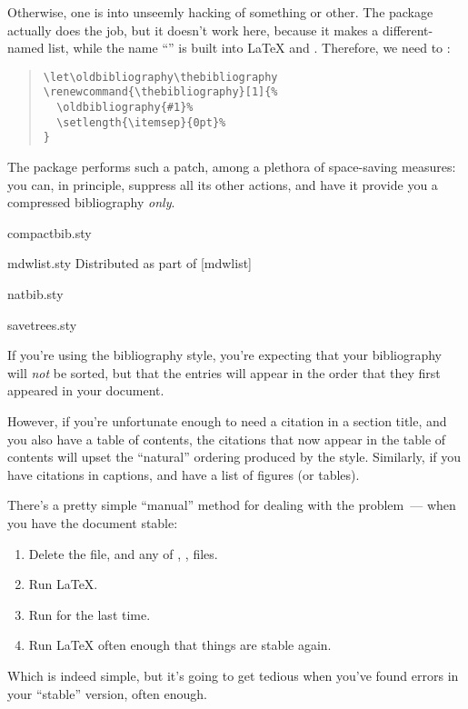 Otherwise, one is into unseemly hacking of something or other.  The
 package actually does the job, but it doesn't work
here, because it makes a different-named list, while the name
``'' is built into \LaTeX{} and
\BibTeX{}.  Therefore, we need to %
:
\begin{quote}
\begin{verbatim}
\let\oldbibliography\thebibliography
\renewcommand{\thebibliography}[1]{%
  \oldbibliography{#1}%
  \setlength{\itemsep}{0pt}%
}
\end{verbatim}
\end{quote}
The  package performs such a patch, among a
plethora of space-saving measures: you can, in principle, suppress all
its other actions, and have it provide you a compressed bibliography
\emph{only}.
\begin{ctanrefs}
\item[compactbib.sty]
\item[mdwlist.sty]Distributed as part of [mdwlist]
\item[natbib.sty]
\item[savetrees.sty]
\end{ctanrefs}


If you're using the  bibliography style, you're
expecting that your bibliography will \emph{not} be sorted, but that
the entries will appear in the order that they first appeared in your
document.

However, if you're unfortunate enough to need a citation in a section
title, and you also have a table of contents, the citations that now
appear in the table of contents will upset the ``natural'' ordering
produced by the  style.  Similarly, if you have
citations in captions, and have a list of figures (or tables).

There's a pretty simple ``manual'' method for dealing with the
problem~--- when you have the document stable:
\begin{enumerate}
\item Delete the  file, and any of ,
  ,  files.
\item Run \LaTeX{}.
\item Run \BibTeX{} for the last time.
\item Run \LaTeX{} often enough that things are stable again.
\end{enumerate}
Which is indeed simple, but it's going to get tedious when you've
found errors in your ``stable'' version, often enough.

